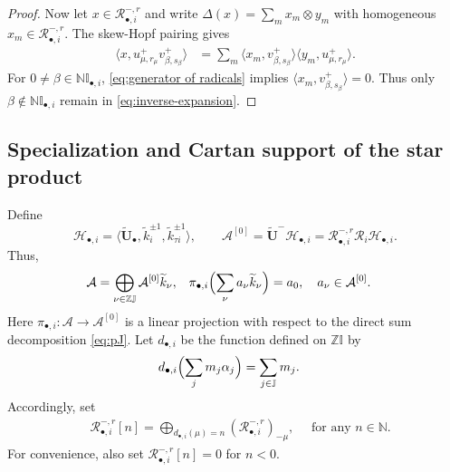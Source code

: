 \documentclass[a4paper,reqno,12pt]{amsart}
\numberwithin{equation}{section}
\theoremstyle{definition}
\theoremstyle{plain}
\theoremstyle{definition}
\def\N{\mathbb N}
\def\Z{\mathbb Z}
\def\I{\mathbb I}
\def\J{\mathbb J}
\def\bIi{\I_{\bullet,i}}
\def\tU{\widetilde{\mathbf U}}
\def \tbU{\tU_{\bullet}}
\def\tk{\widetilde k}
\def\cA{\mathcal A}
\def\cR{\mathcal R}
\def\cH{\mathcal H}
\begin{document}
\begin{proof}
Now let $x\in\cR_{\bullet,i}^{-,r}$ and write
$\Delta(x)=\sum_m x_m\otimes y_m$ with homogeneous
$x_m\in\cR_{\bullet,i}^{-,r}$. The skew-Hopf pairing gives
\begin{align}
\langle x,u^+_{\mu,r_\mu}v^+_{\beta,s_\beta}\rangle
&=\sum_m\langle x_m,v^+_{\beta,s_\beta}\rangle
\langle y_m,u^+_{\mu,r_\mu}\rangle.\label{eq:pair-order}
\end{align}
For $0\ne\beta\in\N \bIi$, \eqref{eq:generator of radicals} implies $\langle x_m,v^+_{\beta,s_\beta}\rangle=0$.
Thus only $\beta\notin\N \bIi$ remain in
\eqref{eq:inverse-expansion}. 
\end{proof}
\subsection{Specialization and Cartan support of the star product}
Define
\begin{equation}\label{eq:local}
    \cH_{\bullet,i}=\langle\tbU,\tk_i^{\pm1},\tk_{\tau i}^{\pm1}\rangle,\qquad
\cA^{[0]}=\tU^-\cH_{\bullet,i}
=\cR_{\bullet,i}^{-,r}\cR_i\cH_{\bullet,i}.
\end{equation}
Thus,
\begin{align}
\cA&=\bigoplus_{\nu\in\Z\J}
\cA^{[0]}\tk_{\nu},
&\pi_{\bullet,i}\Bigl(\sum_{\nu}
a_{\nu}\tk_{\nu}\Bigr)&=a_{0}, \quad a_\nu\in\cA^{[0]}.
\label{eq:pJ}
\end{align}
Here $\pi_{\bullet,i}:\cA\to\cA^{[0]}$ is a linear projection with respect to the direct sum decomposition \eqref{eq:pJ}. Let $d_{\bullet,i}$ be the function defined on $\Z\I$ by
\begin{align}
d_{\bullet,i}\Bigl(\sum_jm_j\alpha_j\Bigr)&=\sum_{j\in\J}m_j.
\end{align}
Accordingly, set 
\begin{align}
&\cR_{\bullet,i}^{-,r}[n]
=\bigoplus_{d_{\bullet,i}(\mu)=n}(\cR_{\bullet,i}^{-,r})_{-\mu},\quad \text{ for any }n\in\N.
\label{eq:outside-degree}
\end{align}
For convenience, also set $\cR_{\bullet,i}^{-,r}[n]=0$ for $n<0$.
\end{document}
